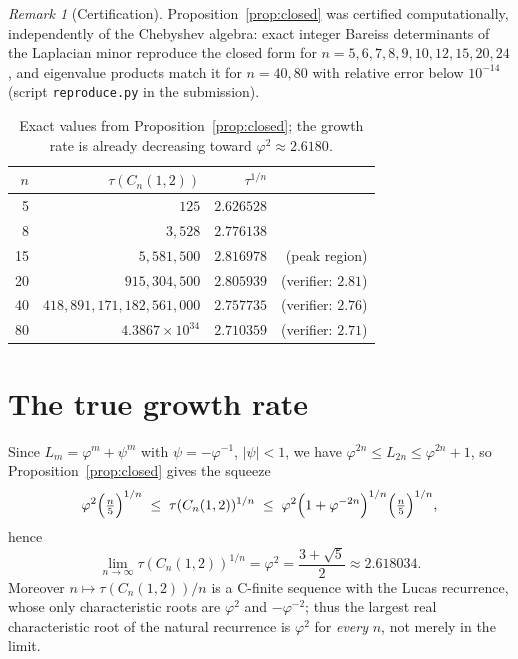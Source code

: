 \documentclass[11pt]{article}
\theoremstyle{remark}
\newtheorem{remark}{Remark}
\begin{document}
\begin{remark}[Certification]
Proposition~\ref{prop:closed} was certified computationally, independently of the
Chebyshev algebra: exact integer Bareiss determinants of the Laplacian minor
reproduce the closed form for $n = 5,6,7,8,9,10,12,15,20,24$, and eigenvalue
products match it for $n = 40,80$ with relative error below $10^{-14}$
(script \texttt{reproduce.py} in the submission).
\end{remark}

\begin{table}[h]
\centering
\begin{tabular}{rrrr}
\toprule
$n$ & $\tau(C_n(1,2))$ & $\tau^{1/n}$ & \\
\midrule
5  & $125$ & $2.626528$ & \\
8  & $3{,}528$ & $2.776138$ & \\
15 & $5{,}581{,}500$ & $2.816978$ & (peak region) \\
20 & $915{,}304{,}500$ & $2.805939$ & (verifier: $2.81$) \\
40 & $418{,}891{,}171{,}182{,}561{,}000$ & $2.757735$ & (verifier: $2.76$) \\
80 & $4.3867\times 10^{34}$ & $2.710359$ & (verifier: $2.71$) \\
\bottomrule
\end{tabular}
\caption{Exact values from Proposition~\ref{prop:closed}; the growth rate is
already decreasing toward $\varphi^2 \approx 2.6180$.}
\end{table}

\section{The true growth rate}

Since $L_m = \varphi^m + \psi^m$ with $\psi = -\varphi^{-1}$, $|\psi|<1$, we have
$\varphi^{2n} \le L_{2n} \le \varphi^{2n} + 1$, so Proposition~\ref{prop:closed}
gives the squeeze
\[
\varphi^2 \Bigl(\tfrac{n}{5}\Bigr)^{1/n}
\;\le\; \tau(C_n(1,2))^{1/n} \;\le\;
\varphi^2 \Bigl(1+\varphi^{-2n}\Bigr)^{1/n}\Bigl(\tfrac{n}{5}\Bigr)^{1/n},
\]
hence
\begin{equation}\label{eq:limit}
\lim_{n\to\infty} \tau(C_n(1,2))^{1/n} = \varphi^2 = \frac{3+\sqrt5}{2} \approx 2.618034 .
\end{equation}
Moreover $n \mapsto \tau(C_n(1,2))/n$ is a C-finite sequence with the Lucas
recurrence, whose only characteristic roots are $\varphi^2$ and $-\varphi^{-2}$;
thus the largest real characteristic root of the natural recurrence is
$\varphi^2$ for \emph{every} $n$, not merely in the limit.
\end{document}
